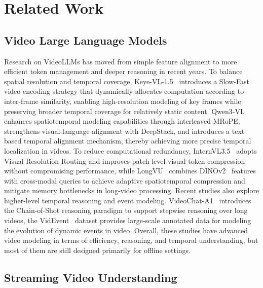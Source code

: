  \section{Related Work}\label{sec:related}

\subsection{Video Large Language Models}

Research on VideoLLMs has moved from simple feature alignment to more efficient token management and deeper reasoning in recent years. To balance spatial resolution and temporal coverage, Keye-VL-1.5~\citep{yang2025kwai} introduces a Slow-Fast video encoding strategy that dynamically allocates computation according to inter-frame similarity, enabling high-resolution modeling of key frames while preserving broader temporal coverage for relatively static content. 
Qwen3-VL~\citep{bai2025qwen3} enhances spatiotemporal modeling capabilities through interleaved-MRoPE, strengthens visual-language alignment with DeepStack, and introduces a text-based temporal alignment mechanism, thereby achieving more precise temporal localization in videos.
To reduce computational redundancy, InternVL3.5~\citep{wang2025internvl3} adopts Visual Resolution Routing and improves patch-level visual token compression without compromising performance, while LongVU~\citep{shen2024longvu} combines DINOv2~\citep{oquab2023dinov2} features with cross-modal queries to achieve adaptive spatiotemporal compression and mitigate memory bottlenecks in long-video processing. Recent studies also explore higher-level temporal reasoning and event modeling. VideoChat-A1~\citep{wang2026videochat} introduces the Chain-of-Shot reasoning paradigm to support stepwise reasoning over long videos, the VidEvent~\citep{liang2025videvent} dataset provides large-scale annotated data for modeling the evolution of dynamic events in video. Overall, these studies have advanced video modeling in terms of efficiency, reasoning, and temporal understanding, but most of them are still designed primarily for offline settings.

\subsection{Streaming Video Understanding}

